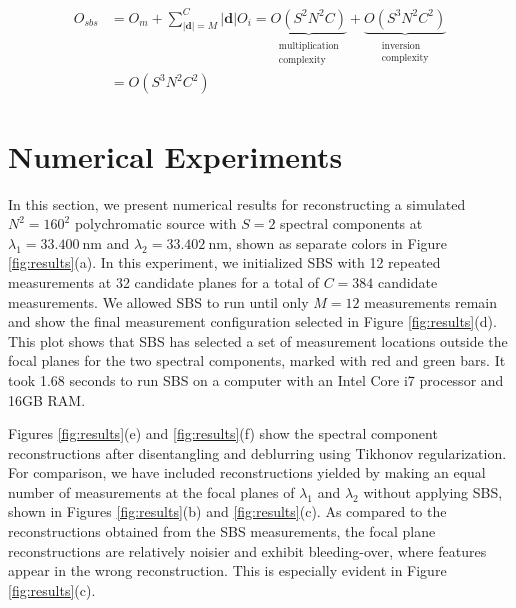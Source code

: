 \documentclass{article}
\begin{document}
\vspace{-0.2 in}
\begin{align*}
  O_{sbs} &= O_m + \sum_{|\bm{d}| = M}^C |\bm{d}| O_i =
  \underbrace{
  O(S^2N^2C)
  }_{\substack{\text{multiplication}\\ \text{complexity}}}
  +
  \underbrace{
  O(S^3N^2C^2)
  }_{\substack{\text{inversion}\\ \text{complexity}}} \\
  &= O(S^3N^2C^2)
\end{align*}

\section{Numerical Experiments}
In this section, we present numerical results for reconstructing a simulated
$N^2{=}160^2$ polychromatic source with $S=2$ spectral components at $\lambda_1 =
\SI{33.400}{\nano\metre}$ and $\lambda_2 = \SI{33.402}{\nano\metre}$, shown as
separate colors in Figure \ref{fig:results}(a). In this experiment, we
initialized SBS with 12 repeated measurements at 32 candidate planes for a total
of $C = 384$ candidate measurements. We allowed SBS to run until only $M = 12$
measurements remain and show the final measurement configuration selected in
Figure \ref{fig:results}(d).  This plot shows that SBS has selected a set of
measurement locations outside the focal planes for the two spectral components,
marked with red and green bars. It took 1.68 seconds to run SBS on a computer
with an Intel Core i7 processor and 16GB RAM.

Figures \ref{fig:results}(e) and \ref{fig:results}(f) show the spectral
component reconstructions after disentangling and deblurring using Tikhonov
regularization. For comparison, we have included reconstructions yielded by
making an equal number of measurements at the focal planes of $\lambda_1$ and
$\lambda_2$ without applying SBS, shown in Figures \ref{fig:results}(b) and
\ref{fig:results}(c).  As compared to the reconstructions obtained from the SBS
measurements, the focal plane reconstructions are relatively noisier and exhibit
bleeding-over, where features appear in the wrong reconstruction.  This is
especially evident in Figure \ref{fig:results}(c).
\end{document}
